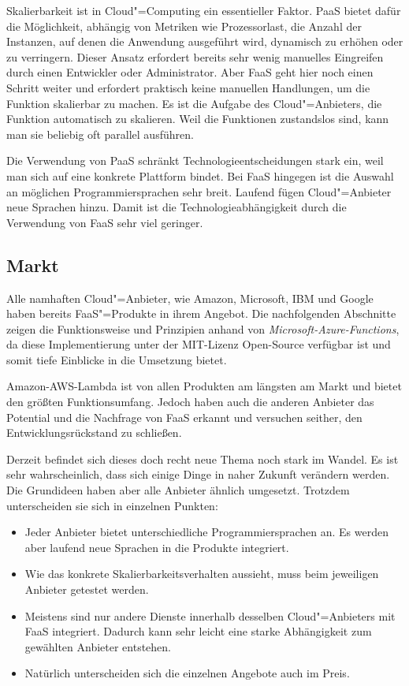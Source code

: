 Skalierbarkeit ist in Cloud"=Computing ein essentieller Faktor. PaaS bietet dafür die Möglichkeit, abhängig von Metriken wie Prozessorlast, die Anzahl der Instanzen, auf denen die Anwendung ausgeführt wird, dynamisch zu erhöhen oder zu verringern. Dieser Ansatz erfordert bereits sehr wenig manuelles Eingreifen durch einen Entwickler oder Administrator. Aber FaaS geht hier noch einen Schritt weiter und erfordert praktisch keine manuellen Handlungen, um die Funktion skalierbar zu machen. Es ist die Aufgabe des Cloud"=Anbieters, die Funktion automatisch zu skalieren. Weil die Funktionen zustandslos sind, kann man sie beliebig oft parallel ausführen.

Die Verwendung von PaaS schränkt Technologieentscheidungen stark ein, weil man sich auf eine konkrete Plattform bindet. Bei FaaS hingegen ist die Auswahl an möglichen Programmiersprachen sehr breit. Laufend fügen Cloud"=Anbieter neue Sprachen hinzu. Damit ist die Technologieabhängigkeit durch die Verwendung von FaaS sehr viel geringer.

\subsection{Markt}

Alle namhaften Cloud"=Anbieter, wie Amazon, Microsoft, IBM und Google haben bereits FaaS"=Produkte in ihrem Angebot. Die nachfolgenden Abschnitte zeigen die Funktionsweise und Prinzipien anhand von \textit{Microsoft-Azure-Functions}, da diese Implementierung unter der MIT-Lizenz Open-Source verfügbar ist und somit tiefe Einblicke in die Umsetzung bietet. 

Amazon-AWS-Lambda ist von allen Produkten am längsten am Markt und bietet den größten Funktionsumfang. Jedoch haben auch die anderen Anbieter das Potential und die Nachfrage von FaaS erkannt und versuchen seither, den Entwicklungsrückstand zu schließen.

Derzeit befindet sich dieses doch recht neue Thema noch stark im Wandel. Es ist sehr wahrscheinlich, dass sich einige Dinge in naher Zukunft verändern werden. Die Grundideen haben aber alle Anbieter ähnlich umgesetzt. Trotzdem unterscheiden sie sich in einzelnen Punkten:

\begin{itemize}
	\item Jeder Anbieter bietet unterschiedliche Programmiersprachen an. Es werden aber laufend neue Sprachen in die Produkte integriert.
	\item Wie das konkrete Skalierbarkeitsverhalten aussieht, muss beim jeweiligen Anbieter getestet werden.
	\item Meistens sind nur andere Dienste innerhalb desselben Cloud"=Anbieters mit FaaS integriert. Dadurch kann sehr leicht eine starke Abhängigkeit zum gewählten Anbieter entstehen.
	\item Natürlich unterscheiden sich die einzelnen Angebote auch im Preis.
\end{itemize}

